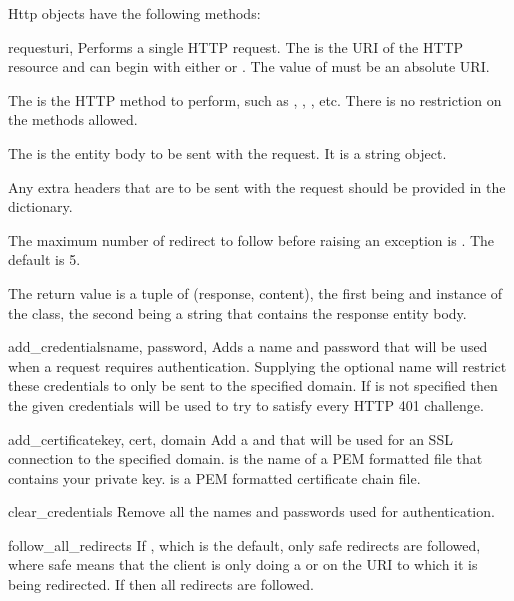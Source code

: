 Http objects have the following methods:

\begin{methoddesc}[Http]{request}{uri, }
Performs a single HTTP request.
The  is the URI of the HTTP resource and can begin with either  or . The value of  must be an absolute URI.

The  is the HTTP method to perform, such as , , , etc. There is no restriction
on the methods allowed.

The  is the entity body to be sent with the request. It is a string
object.

Any extra headers that are to be sent with the request should be provided in the
 dictionary.

The maximum number of redirect to follow before raising an exception is . The default is 5.

The return value is a tuple of (response, content), the first being and instance of the
 class, the second being a string that contains the response entity body.
\end{methoddesc}

\begin{methoddesc}[Http]{add_credentials}{name, password, }
Adds a name and password that will be used when a request 
requires authentication. Supplying the optional  name will
restrict these credentials to only be sent to the specified
domain. If  is not specified then the given credentials will
be used to try to satisfy every HTTP 401 challenge.
\end{methoddesc}

\begin{methoddesc}[Http]{add_certificate}{key, cert, domain}
Add a  and  that will be used for an SSL connection
to the specified domain.  is the name of a PEM formatted 
file that contains your private key.  is a PEM formatted certificate chain file. 
\end{methoddesc}

\begin{methoddesc}[Http]{clear_credentials}{}
Remove all the names and passwords used for authentication.
\end{methoddesc}

\begin{memberdesc}[Http]{follow_all_redirects}
If , which is the default, only safe redirects are followed, where
safe means that the client is only doing a  or  on the
URI to which it is being redirected. If  then all redirects are followed.
\end{memberdesc}

